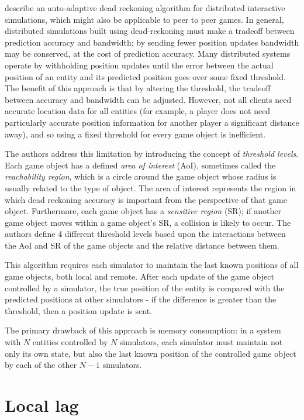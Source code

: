 \documentclass[conference]{IEEEtran}
\begin{document}
	\Textcite{cai1999auto} describe an auto-adaptive dead reckoning algorithm for distributed interactive simulations, which might also be applicable to peer to peer games. In general, distributed simulations built using dead-reckoning must make a tradeoff between prediction accuracy and bandwidth; by sending fewer position updates bandwidth may be conserved, at the cost of prediction accuracy. Many distributed systems operate by withholding position updates until the error between the actual position of an entity and its predicted position goes over some fixed threshold. The benefit of this approach is that by altering the threshold, the tradeoff between accuracy and bandwidth can be adjusted. However, not all clients need accurate location data for all entities (for example, a player does not need particularly accurate position information for another player a significant distance away), and so using a fixed threshold for every game object is inefficient.

	The authors address this limitation by introducing the concept of \emph{threshold levels}. Each game object has a defined \emph{area of interest} (AoI), sometimes called the \emph{reachability region}, which is a circle around the game object whose radius is usually related to the type of object. The area of interest represents the region in which dead reckoning accuracy is important from the perspective of that game object. Furthermore, each game object has a \emph{sensitive region} (SR); if another game object moves within a game object's SR, a collision is likely to occur. The authors define 4 different threshold levels based upon the interactions between the AoI and SR of the game objects and the relative distance between them.

	This algorithm requires each simulator to maintain the last known positions of all game objects, both local and remote. After each update of the game object controlled by a simulator, the true position of the entity is compared with the predicted positions at other simulators - if the difference is greater than the threshold, then a position update is sent.

	The primary drawback of this approach is memory consumption: in a system with $N$ entities controlled by $N$ simulators, each simulator must maintain not only its own state, but also the last known position of the controlled game object by each of the other $N - 1$ simulators.

	\section{Local lag}
\end{document}
